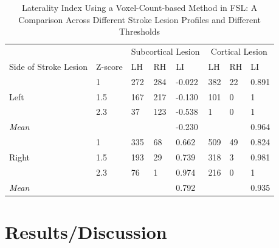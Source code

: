 \documentclass[twocolumn]{bmcart}%
\begin{document}
\begin{table}[t!]
\caption{\label{stattable} Laterality Index Using a Voxel-Count-based Method in FSL: A Comparison Across Different Stroke Lesion Profiles and Different Thresholds}
\begin{tabular}{l l l l l l l l}
 \hline\noalign{\smallskip}
                         &            & \multicolumn{3}{c}{Subcortical Lesion} & \multicolumn{3}{c}{Cortical Lesion} \\
  Side of Stroke Lesion  & Z-score    & LH         & RH           & LI         & LH         & RH           & LI      \\
   \hline\noalign{\smallskip}
                         & 1          & 272        & 284          & -0.022     & 382        & 22           & 0.891 \\
  Left                   & 1.5        & 167        & 217          & -0.130     & 101        & 0            & 1  \\
                         & 2.3        & 37         & 123          & -0.538     & 1          & 0            & 1  \\         
 \hline  
 \emph{Mean}             &            &            &              & -0.230     &            &              & 0.964 \\
 \noalign{\smallskip}
                         & 1          & 335        & 68           &  0.662     & 509        & 49           & 0.824 \\
  Right                  & 1.5        & 193        & 29           &  0.739     & 318        & 3            & 0.981  \\
                         & 2.3        & 76         & 1            &  0.974     & 216        & 0            & 1  \\
  \hline
  \emph{Mean}            &            &            &              &  0.792     &            &              & 0.935 \\  
\end{tabular}
\end{table}

\section{Results/Discussion}\label{resultsdiscussion}
\end{document}
